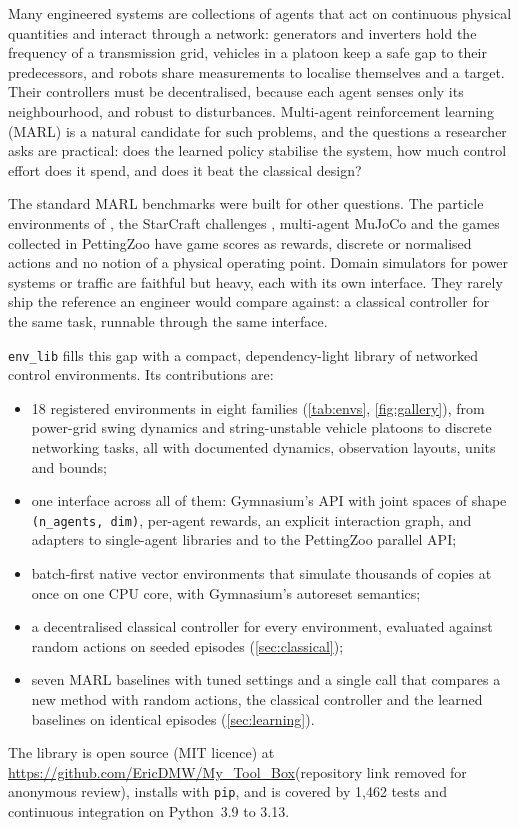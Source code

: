 \documentclass{article}
\newcommand{\NumTests}{1{,}462}
\newcommand{\NumIds}{18}
\newcommand{\NumFamilies}{eight}
\newcommand{\repo}{\ificmlshowauthors\url{https://github.com/EricDMW/My_Tool_Box}\else(repository link removed for anonymous review)\fi}
\newcommand{\code}[1]{\texttt{#1}}
\begin{document}
Many engineered systems are collections of agents that act on continuous
physical quantities and interact through a network: generators and inverters
hold the frequency of a transmission grid, vehicles in a platoon keep a safe
gap to their predecessors, and robots share measurements to localise
themselves and a target. Their controllers must be decentralised, because
each agent senses only its neighbourhood, and robust to disturbances.
Multi-agent reinforcement learning (MARL) is a natural candidate for such
problems, and the questions a researcher asks are practical: does the learned
policy stabilise the system, how much control effort does it spend, and does
it beat the classical design?

The standard MARL benchmarks were built for other questions. The particle
environments of \citet{lowe2017maddpg}, the StarCraft challenges
\citep{samvelyan2019smac,ellis2023smacv2}, multi-agent MuJoCo
\citep{peng2021facmac} and the games collected in PettingZoo
\citep{terry2021pettingzoo} have game scores as rewards, discrete or
normalised actions and no notion of a physical operating point. Domain
simulators for power systems \citep{marot2020l2rpn,wang2021mapdn} or traffic
\citep{wu2022flow} are faithful but heavy, each with its own interface. They
rarely ship the reference an engineer would compare against: a classical
controller for the same task, runnable through the same interface.

\texttt{env\_lib} fills this gap with a compact, dependency-light library of
networked control environments. Its contributions are:
\begin{itemize}
  \setlength{\itemsep}{1pt}
  \item {\NumIds} registered environments in {\NumFamilies} families
    (\cref{tab:envs}, \cref{fig:gallery}), from power-grid swing dynamics and
    string-unstable vehicle platoons to discrete networking tasks, all with
    documented dynamics, observation layouts, units and bounds;
  \item one interface across all of them: Gymnasium's API with joint spaces of
    shape \code{(n\_agents, dim)}, per-agent rewards, an explicit interaction
    graph, and adapters to single-agent libraries and to the PettingZoo
    parallel API;
  \item batch-first native vector environments that simulate thousands of
    copies at once on one CPU core, with Gymnasium's autoreset semantics;
  \item a decentralised classical controller for every environment,
    evaluated against random actions on seeded episodes
    (\cref{sec:classical});
  \item seven MARL baselines with tuned settings and a single call that
    compares a new method with random actions, the classical controller and
    the learned baselines on identical episodes (\cref{sec:learning}).
\end{itemize}
The library is open source (MIT licence) at \repo, installs with
\code{pip}, and is covered by {\NumTests} tests and continuous integration on
Python~3.9 to 3.13.
\end{document}
